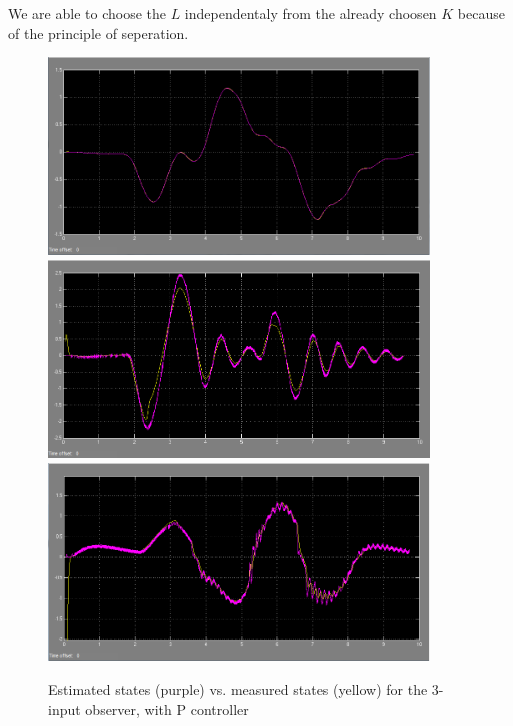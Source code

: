 We are able to choose the $L$ independentaly from the already choosen $K$ because of the principle of seperation. \\
\begin{figure}[H]
\includegraphics[width=0.9\textwidth,height=0.1\textheight]{Pitch.png}\\
\includegraphics[width=0.9\textwidth,height=0.1\textheight]{Pitch_Rate.png}\\
\includegraphics[width=0.9\textwidth,height=0.1\textheight]{Elevation_Rate.png}\\
\caption{Estimated states (purple) vs. measured states (yellow) for the 3-input observer, with P controller}
\label{fig:my_label}
\end{figure}


